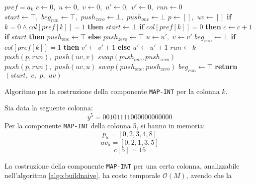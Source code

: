 \begin{algorithm}
  \small
  \begin{algorithmic}[1]
    \Comment $pref=a_k$
    \State $c\gets 0,\,\,u\gets 0,\,\,v\gets 0,\,\,u'\gets 0,\,\, v'\gets
    0,\,\,run\gets 0$
    \State $start \gets \top,\,\,beg_{run}\gets \top,\,\,push_{zero}\gets
    \bot,\,\,push_{one}\gets \bot$
    \State $p\gets [],\,\,uv\gets []$
    \For {\textit{every} $k\in\left[0,\,\, M\right)$}
    \State \textbf{if} $k=0\land col[pref[k]]=1$ \textbf{then} $start \gets \bot$ 
    \State \textbf{if} $col[pref[k]]=0$ \textbf{then} $c\gets c+1$
    \EndFor
    \State \textbf{if} $start$ \textbf{then} $push_{one}\gets \top$
    \textbf{else} $push_{zero}\gets \top$
    \For{\textit{every} $k\in[0,M)$}
    \State $u\gets u',\,\,v\gets v'$
    \State $beg_{run}\gets \bot$
    \EndIf
    \State \textbf{if} $col[pref[k]]=1$ \textbf{then}  $v'\gets v'+1$
    \textbf{else} $u'\gets u'+1$
    \State $run\gets k$
    \EndIf
    \State $push(p, run),\,\,push(uv, v)$
    \State $swap(push_{one}, push_{zero})$
    \Else
    \State $push(p, run),\,\,push(uv, u)$
    \State $swap(push_{one}, push_{zero})$
    \EndIf
    \State $beg_{run}\gets \top$
    \EndIf
    \EndFor
    \State \textbf{return} $(start,\,\, c,\,\, p,\,\, uv)$
    \EndFunction
  \end{algorithmic}
  \caption{\footnotesize{Algoritmo per la costruzione della componente
  \texttt{MAP-INT} per la colonna $k$.}}
  \label{algo:buildnaive}
\end{algorithm}
\begin{esempio}
  Sia data la seguente colonna:
  \[y^5=00101111000000000000\]
  Per la componente \texttt{MAP-INT} della colonna 5, si hanno in memoria:
  \[p_5=[0,2,3,4,8]\]
  \[uv_5=[0,2,1,3,5]\]
  \[c[5]=15\]
\end{esempio}
La costruzione della componente \texttt{MAP-INT} per una certa colonna,
analizzabile nell'algoritmo 
\ref{algo:buildnaive}, ha costo temporale $\mathcal{O}(M)$, avendo che la
